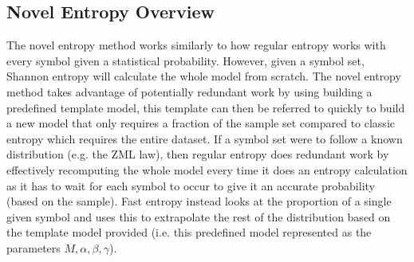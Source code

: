 %
%
%




\subsection{Novel Entropy Overview}
The novel entropy method works similarly to how regular entropy works with every symbol given a statistical probability. However, given a symbol set, Shannon entropy will calculate the whole model from scratch. The novel entropy method takes advantage of potentially redundant work by using building a predefined template model, this template can then be referred to quickly to build a new model that only requires a fraction of the sample set compared to classic entropy which requires the entire dataset. If a symbol set were to follow a known distribution (e.g. the ZML law), then regular entropy does redundant work by effectively recomputing the whole model every time it does an entropy calculation as it has to wait for each symbol to occur to give it an accurate probability (based on the sample). Fast entropy instead looks at the proportion of a single given symbol and uses this to extrapolate the rest of the distribution based on the template model provided (i.e. this predefined model represented as the parameters $M, \alpha, \beta, \gamma$). \\



